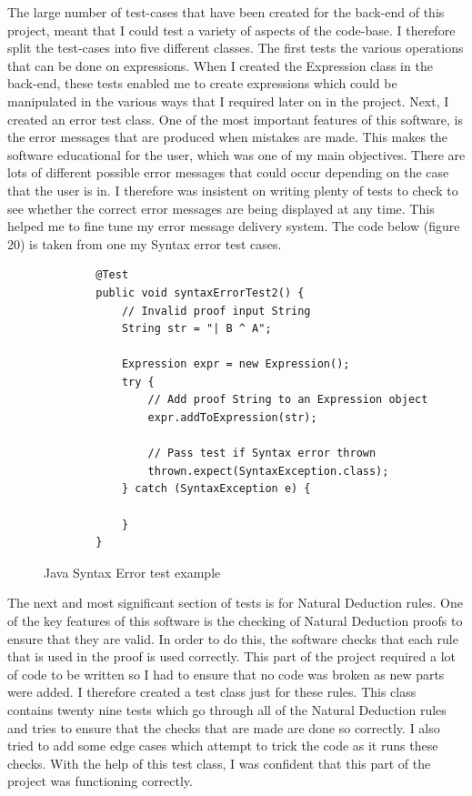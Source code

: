 The large number of test-cases that have been created for the back-end of this project, meant that I could test a variety of aspects of the code-base. I therefore split the test-cases into five different classes. The first tests the various operations that can be done on expressions. When I created the Expression class in the back-end, these tests enabled me to create expressions which could be manipulated in the various ways that I required later on in the project. Next, I created an error test class. One of the most important features of this software, is the error messages that are produced when mistakes are made. This makes the software educational for the user, which was one of my main objectives. There are lots of different possible error messages that could occur depending on the case that the user is in. I therefore was insistent on writing plenty of tests to check to see whether the correct error messages are being displayed at any time. This helped me to fine tune my error message delivery system. The code below (figure 20) is taken from one my Syntax error test cases.

\begin{figure}[!ht]

	\begin{lstlisting}
		@Test
		public void syntaxErrorTest2() {
			// Invalid proof input String
			String str = "| B ^ A";
	
			Expression expr = new Expression();
			try {
				// Add proof String to an Expression object
				expr.addToExpression(str);
				
				// Pass test if Syntax error thrown
				thrown.expect(SyntaxException.class);
			} catch (SyntaxException e) {
	
			}
		}
	\end{lstlisting}
\caption{Java Syntax Error test example }
\end{figure}

The next and most significant section of tests is for Natural Deduction rules. One of the key features of this software is the checking of Natural Deduction proofs to ensure that they are valid. In order to do this, the software checks that each rule that is used in the proof is used correctly. This part of the project required a lot of code to be written so I had to ensure that no code was broken as new parts were added. I therefore created a test class just for these rules. This class contains twenty nine tests which go through all of the Natural Deduction rules and tries to ensure that the checks that are made are done so correctly. I also tried to add some edge cases which attempt to trick the code as it runs these checks. With the help of this test class, I was confident that this part of the project was functioning correctly.

